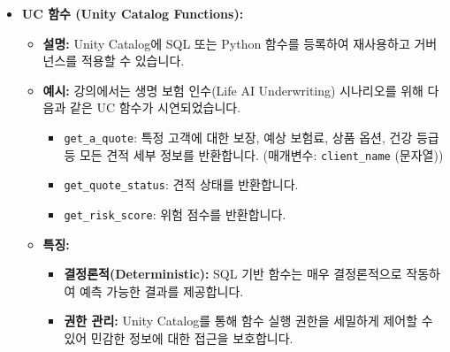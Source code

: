 \documentclass[11pt,a4paper]{article}
\theoremstyle{definition}
\begin{document}
\begin{itemize}
    \item \textbf{UC 함수 (Unity Catalog Functions):}
    \begin{itemize}
        \item \textbf{설명:} Unity Catalog에 SQL 또는 Python 함수를 등록하여 재사용하고 거버넌스를 적용할 수 있습니다.
        \item \textbf{예시:} 강의에서는 생명 보험 인수(Life AI Underwriting) 시나리오를 위해 다음과 같은 UC 함수가 시연되었습니다.
        \begin{itemize}
            \item \texttt{get_a_quote}: 특정 고객에 대한 보장, 예상 보험료, 상품 옵션, 건강 등급 등 모든 견적 세부 정보를 반환합니다. (매개변수: \texttt{client_name} (문자열))
            \item \texttt{get_quote_status}: 견적 상태를 반환합니다.
            \item \texttt{get_risk_score}: 위험 점수를 반환합니다.
        \end{itemize}
        \item \textbf{특징:}
        \begin{itemize}
            \item \textbf{결정론적(Deterministic):} SQL 기반 함수는 매우 결정론적으로 작동하여 예측 가능한 결과를 제공합니다.
            \item \textbf{권한 관리:} Unity Catalog를 통해 함수 실행 권한을 세밀하게 제어할 수 있어 민감한 정보에 대한 접근을 보호합니다.
        \end{itemize}
    \end{itemize}


\end{itemize}
\end{document}
